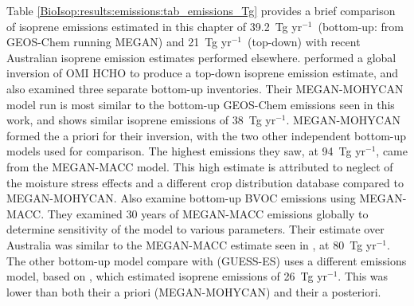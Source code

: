 \documentclass[acp, manuscript]{copernicus}
\newcommand{\textcite}{\citet}
\newcommand{\tgpyr}{~Tg yr$^{-1}$}
\begin{document}
      Table \ref{BioIsop:results:emissions:tab_emissions_Tg} provides a brief comparison of isoprene emissions estimated in this chapter of 39.2\tgpyr ~(bottom-up: from GEOS-Chem running MEGAN) and 21\tgpyr ~(top-down) with recent Australian isoprene emission estimates performed elsewhere.
      \textcite{Bauwens2016} performed a global inversion of OMI HCHO to produce a top-down isoprene emission estimate, and also examined three separate bottom-up inventories.
      Their MEGAN-MOHYCAN model run is most similar to the bottom-up GEOS-Chem emissions seen in this work, and shows similar isoprene emissions of 38\tgpyr.
      MEGAN-MOHYCAN formed the a priori for their inversion, with the two other independent bottom-up models used for comparison.
      The highest emissions they saw, at 94\tgpyr, came from the MEGAN-MACC model.
      This high estimate is attributed to neglect of the moisture stress effects and a different crop distribution database compared to MEGAN-MOHYCAN.
      \textcite{Sindelarova2014} Also examine bottom-up BVOC emissions using MEGAN-MACC.
      They examined 30 years of MEGAN-MACC emissions globally to determine sensitivity of the model to various parameters.
      Their estimate over Australia was similar to the MEGAN-MACC estimate seen in \textcite{Bauwens2016}, at 80\tgpyr. 
      The other bottom-up model \textcite{Bauwens2016} compare with (GUESS-ES) uses a different emissions model, based on \textcite{Niinemets1999}, which estimated isoprene emissions of 26\tgpyr.
      This was lower than both their a priori (MEGAN-MOHYCAN) and their a posteriori.
      
\end{document}
